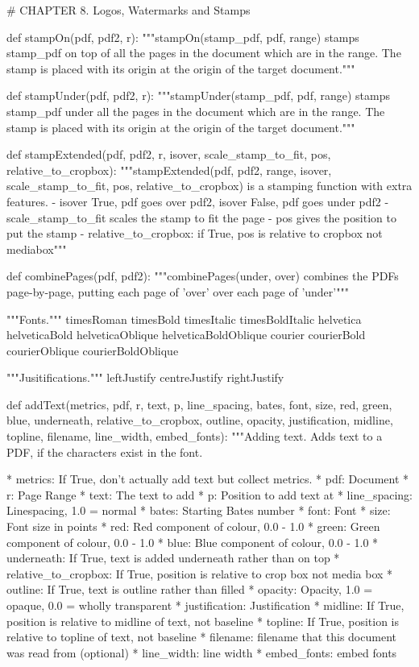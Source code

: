 # CHAPTER 8. Logos, Watermarks and Stamps

def stampOn(pdf, pdf2, r):
    """stampOn(stamp_pdf, pdf, range) stamps stamp_pdf on top of all the
    pages in the document which are in the range. The stamp is placed with its
    origin at the origin of the target document."""

def stampUnder(pdf, pdf2, r):
    """stampUnder(stamp_pdf, pdf, range) stamps stamp_pdf under all the pages
    in the document which are in the range. The stamp is placed with its origin
    at the origin of the target document."""

def stampExtended(pdf, pdf2, r, isover, scale_stamp_to_fit, pos,
                  relative_to_cropbox):
    """stampExtended(pdf, pdf2, range, isover, scale_stamp_to_fit, pos,
    relative_to_cropbox) is a stamping function with extra features.
     - isover True, pdf goes over pdf2, isover False, pdf goes under pdf2
     - scale_stamp_to_fit scales the stamp to fit the page
     - pos gives the position to put the stamp
     - relative_to_cropbox: if True, pos is relative to cropbox not mediabox"""

def combinePages(pdf, pdf2):
    """combinePages(under, over) combines the PDFs page-by-page, putting
    each page of 'over' over each page of 'under'"""

"""Fonts."""
timesRoman
timesBold
timesItalic
timesBoldItalic
helvetica
helveticaBold
helveticaOblique
helveticaBoldOblique
courier
courierBold
courierOblique
courierBoldOblique

"""Jusitifications."""
leftJustify
centreJustify
rightJustify


def addText(metrics, pdf, r, text, p, line_spacing, bates, font, size, red,
            green, blue, underneath, relative_to_cropbox, outline, opacity,
            justification, midline, topline, filename, line_width,
            embed_fonts):
    """Adding text. Adds text to a PDF, if the characters exist in the font.

         * metrics: If True, don't actually add text but collect metrics.
         * pdf:	Document
         * r: Page Range
         * text: The text to add
         * p: Position to add text at
         * line_spacing: Linespacing, 1.0 = normal
         * bates: Starting Bates number
         * font: Font
         * size: Font size in points
         * red: Red component of colour, 0.0 - 1.0
         * green: Green component of colour, 0.0 - 1.0
         * blue: Blue component of colour, 0.0 - 1.0
         * underneath: If True, text is added underneath rather than on top
         * relative_to_cropbox: If True, position is relative to crop box not
           media box
         * outline: If True, text is outline rather than filled
         * opacity: Opacity, 1.0 = opaque, 0.0 = wholly transparent
         * justification: Justification
         * midline: If True, position is relative to midline of text, not
           baseline
         * topline: If True, position is relative to topline of text, not
           baseline
         * filename: filename that this document was read from (optional)
         * line_width: line width
         * embed_fonts: embed fonts

